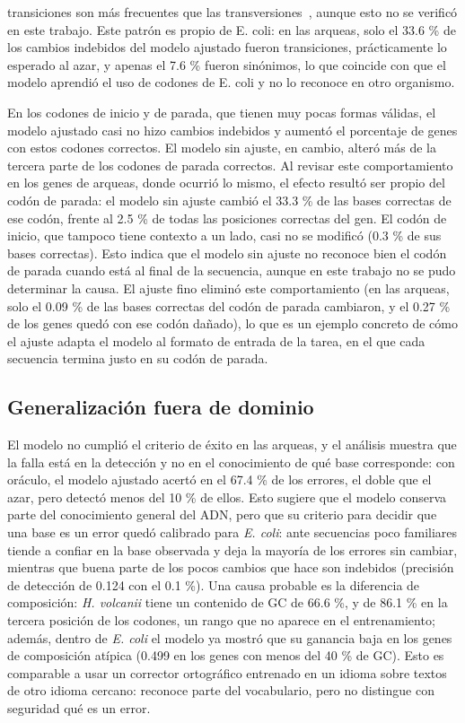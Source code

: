 \documentclass[sigconf,nonacm]{acmart}
\begin{document}
transiciones son más frecuentes que las transversiones~\cite{wakeley1996excess}, aunque esto no se verificó en este trabajo. Este patrón es propio de E. coli: en las arqueas, solo el 33.6 \% de los cambios indebidos del modelo ajustado fueron transiciones, prácticamente lo esperado al azar, y apenas el 7.6 \% fueron sinónimos, lo que coincide con que el modelo aprendió el uso de codones de E. coli y no lo reconoce en otro organismo.

En los codones de inicio y de parada, que tienen muy pocas formas válidas, el modelo ajustado casi no hizo cambios indebidos y aumentó el porcentaje de genes con estos codones correctos. El modelo sin ajuste, en cambio, alteró más de la tercera parte de los codones de parada correctos. Al revisar este comportamiento en los genes de arqueas, donde ocurrió lo mismo, el efecto resultó ser propio del codón de parada: el modelo sin ajuste cambió el 33.3 \% de las bases correctas de ese codón, frente al 2.5 \% de todas las posiciones correctas del gen. El codón de inicio, que tampoco tiene contexto a un lado, casi no se modificó (0.3 \% de sus bases correctas). Esto indica que el modelo sin ajuste no reconoce bien el codón de parada cuando está al final de la secuencia, aunque en este trabajo no se pudo determinar la causa. El ajuste fino eliminó este comportamiento (en las arqueas, solo el 0.09 \% de las bases correctas del codón de parada cambiaron, y el 0.27 \% de los genes quedó con ese codón dañado), lo que es un ejemplo concreto de cómo el ajuste adapta el modelo al formato de entrada de la tarea, en el que cada secuencia termina justo en su codón de parada.

\subsection{Generalización fuera de dominio}\label{sec:disc-dominio}

El modelo no cumplió el criterio de éxito en las arqueas, y el análisis muestra que la falla está en la detección y no en el conocimiento de qué base corresponde: con oráculo, el modelo ajustado acertó en el 67.4 \% de los errores, el doble que el azar, pero detectó menos del 10 \% de ellos. Esto sugiere que el modelo conserva parte del conocimiento general del ADN, pero que su criterio para decidir que una base es un error quedó calibrado para \emph{E. coli}: ante secuencias poco familiares tiende a confiar en la base observada y deja la mayoría de los errores sin cambiar, mientras que buena parte de los pocos cambios que hace son indebidos (precisión de detección de 0.124 con el 0.1 \%). Una causa probable es la diferencia de composición: \emph{H. volcanii} tiene un contenido de GC de 66.6 \%, y de 86.1 \% en la tercera posición de los codones, un rango que no aparece en el entrenamiento; además, dentro de \emph{E. coli} el modelo ya mostró que su ganancia baja en los genes de composición atípica (0.499 en los genes con menos del 40 \% de GC). Esto es comparable a usar un corrector ortográfico entrenado en un idioma sobre textos de otro idioma cercano: reconoce parte del vocabulario, pero no distingue con seguridad qué es un error.
\end{document}
